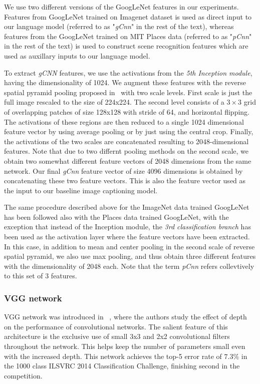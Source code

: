 We use two different versions of the GoogLeNet features in our experiments.
Features from GoogLeNet trained on Imagenet dataset is used as direct input to
our language model (referred to as "\emph{gCnn}" in the rest of the text),
whereas features from the GoogLeNet trained on MIT Places data (referred to as
"\emph{pCnn}" in the rest of the text) is used to construct scene recognition
features which are used as auxillary inputs to our language model.

To extract \emph{gCNN} features, we use the activations from the
\emph{5th Inception module}, having the dimensionality of 1024.
We augment these features with the reverse spatial pyramid pooling proposed
in~\cite{Gong2014} with two scale levels.
First scale is just the full image rescaled to the size of 224x224.
The second level consists of a $3\times3$ grid of overlapping patches of size
128x128 with stride of 64, and horizontal flipping.
The activations of these regions are then reduced to a single 1024 dimensional
feature vector by using average pooling or by just using the central crop.
Finally, the activations of the two scales are concatenated resulting to
2048-dimensional features.
Note that due to two differnt pooling methods on the second scale, we obtain
two somewhat different feature vectors of 2048 dimensions from the same network.
Our final \emph{gCnn} feature vector of size 4096 dimensions is obtained by
concatenating these two feature vectors.
This is also the feature vector used as the input to our baseline image
captioning model. 

The same procedure described above for the ImageNet data trained GoogLeNet has
been followed also with the Places data trained GoogLeNet, with the exception
that instead of the Inception module, the \emph{3rd classification branch} has
been used as the activation layer where the feature vectors have been extracted.
In this case, in addition to mean and center pooling in the second scale of
reverse spatial pyramid, we also use max pooling, and thus obtain three
different features with the dimensionality of 2048 each.
Note that the term \emph{pCnn} refers collevtively to this set of 3 features.

\subsubsection{VGG network} 
VGG network was introduced in ~\cite{Simonyan14c}, where the authors study the
effect of depth on the performance of convolutional networks.
The salient feature of this architecture is the exclusive use of small 3x3 and
2x2 convolutional filters throughout the network.
This helps keep the number of parameters small even with the increased depth.
This network achieves the top-5 error rate of $7.3\%$ in the 1000 class ILSVRC
2014 Classification Challenge, finishing second in the competition.

